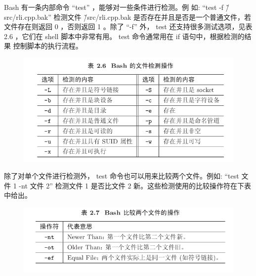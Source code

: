 \documentclass[12pt，a4paper]{article}
\numberwithin{equation}{section}
\begin{document}
Bash 有一条内部命令 “test” ，能够对一些条件进行检测。例
如: “test -f \~/src/rli.cpp.bak” 检测文件 \~/src/rli.cpp.bak
是否存在并且是否是一个普通文件，若文件存在则返回 0 ，否则返回
1 。除了 “-f” 外， test 还支持很多测试选项，见表 2.6 ，它们在 shell
脚本中非常有用。 test 命令通常用在 if 语句中，根据检测的结果
控制脚本的执行流程。
\begin{figure}[H]
\centering
\includegraphics[scale=0.6]{./figures/261.png}
\end{figure}
除了对单个文件进行检测外， test 命令也可以用来比较两个文件。例如: “test 文件 1 -nt 文件 2” 检测文件 1 是否比文件 2 新。这些检测使用的比较操作符在下表中给出。
\begin{figure}[H]
\centering
\includegraphics[scale=0.6]{./figures/262.png}
\end{figure}
\end{document}

